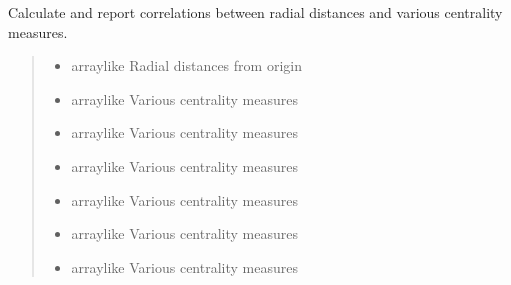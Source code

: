 \documentclass[letterpaper,10pt,english]{sphinxmanual}
\begin{document}
\begin{fulllineitems}
\label{\detokenize{graphem:graphem.visualization.report_full_correlation_matrix}}
\pysigstartsignatures
{}
\pysigstopsignatures
\sphinxAtStartPar
Calculate and report correlations between radial distances and various centrality measures.
\begin{quote}\begin{description}
\begin{itemize}
\item {} 
\sphinxAtStartPar
{} \textendash{} array\sphinxhyphen{}like
Radial distances from origin

\item {} 
\sphinxAtStartPar
{} \textendash{} array\sphinxhyphen{}like
Various centrality measures

\item {} 
\sphinxAtStartPar
{} \textendash{} array\sphinxhyphen{}like
Various centrality measures

\item {} 
\sphinxAtStartPar
{} \textendash{} array\sphinxhyphen{}like
Various centrality measures

\item {} 
\sphinxAtStartPar
{} \textendash{} array\sphinxhyphen{}like
Various centrality measures

\item {} 
\sphinxAtStartPar
{} \textendash{} array\sphinxhyphen{}like
Various centrality measures

\item {} 
\sphinxAtStartPar
{} \textendash{} array\sphinxhyphen{}like
Various centrality measures


\end{itemize}
\end{description}
\end{quote}
\end{fulllineitems}
\end{document}
